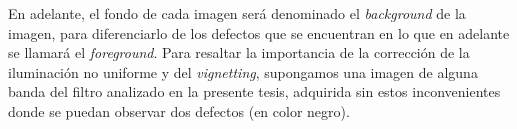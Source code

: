 	\begin{figure}[H]
		\begin{floatrow}
		\end{floatrow}
	\end{figure}
	
En adelante, el fondo de cada imagen será denominado el \textit{background} de la imagen, para diferenciarlo de los defectos que se encuentran en lo que en adelante se llamará el \textit{foreground}. Para resaltar la importancia de la corrección de la iluminación no uniforme y del \textit{vignetting}, supongamos una imagen de alguna banda del filtro analizado en la presente tesis, adquirida sin estos inconvenientes donde se puedan observar dos defectos (en color negro).


